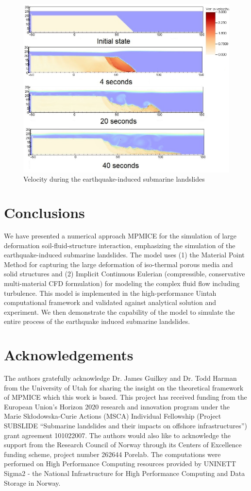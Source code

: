 \documentclass[preprint,12pt]{elsarticle}
\begin{document}
%
%
\begin{figure}[H]
\center
\includegraphics[scale=0.5]{landslide_vel.jpeg}
\caption{Velocity during the earthquake-induced submarine landslides}
\label{fig:vel}
\end {figure}
%
%
\section{\textsf{Conclusions}}
We have presented a numerical approach MPMICE for the simulation of large deformation soil-fluid-structure interaction, emphasizing the simulation of the earthquake-induced submarine landslides. The model uses (1) the Material Point Method for capturing the large deformation of iso-thermal porous media and solid structures and (2) Implicit Continuous Eulerian (compressible, conservative multi-material CFD formulation) for modeling the complex fluid flow including turbulence. This model is implemented in the high-performance Uintah computational framework and validated against analytical solution and experiment. We then demonstrate the capability of the model to simulate the entire process of the earthquake induced submarine landslides.

\section{\textsf{Acknowledgements}}
The authors gratefully acknowledge Dr. James Guilkey and Dr. Todd Harman from the University of Utah for sharing the insight on the theoretical framework of MPMICE which this work is based. This project has received funding from the European Union’s Horizon 2020 research and innovation program under the Marie Skłodowska-Curie Actions (MSCA) Individual Fellowship (Project SUBSLIDE “Submarine landslides and their impacts on offshore infrastructures”) grant agreement 101022007. The authors would also like to acknowledge the support from the Research Council of Norway through its Centers of Excellence funding scheme, project number 262644 Porelab. The computations were performed on High Performance Computing resources provided by UNINETT Sigma2 - the National Infrastructure for High Performance Computing and Data Storage in Norway.
\end{document}

